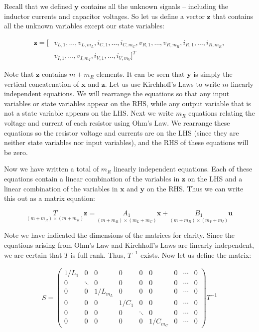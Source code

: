 \documentclass[14pt,a5paper,twoside]{book}
\begin{document}
Recall that we defined $\mathbf{y}$ contains all the unknown signals -- including the inductor currents and capacitor voltages. So let us define a vector $\mathbf{z}$ that contains all the unknown variables except our state variables:

\begin{align*}
\mathbf{z} = [&v_{L,1}, \ldots ,v_{L,m_L}, i_{C,1}, \ldots ,i_{C,m_C}, v_{R,1}, \ldots ,v_{R,m_R}, i_{R,1}, \ldots ,i_{R,m_R}, \\
			&v_{I,1}, \ldots, v_{I,m_I}, i_{V,1}, \ldots, i_{V,m_V}]^T
\end{align*}

Note that $\mathbf{z}$ contains $m+m_R$ elements. It can be seen that $\mathbf{y}$ is simply the vertical concatenation of $\mathbf{x}$ and $\mathbf{z}$. Let us use Kirchhoff's Laws to write $m$ linearly independent equations. We will rearrange the equations so that any input variables or state variables appear on the RHS, while any output variable that is not a state variable appears on the LHS. Next we write $m_R$ equations relating the voltage and current of each resistor using Ohm's Law. We rearrange these equations so the resistor voltage and currents are on the LHS (since they are neither state variables nor input variables), and the RHS of these equations will be zero.

Now we have written a total of $m_R$ linearly independent equations. Each of these equations contain a linear combination of the variables in $\mathbf{z}$ on the LHS and a linear combination of the variables in $\mathbf{x}$ and $\mathbf{y}$ on the RHS. Thus we can write this out as a matrix equation:

$$
\underset{(m+m_R)\times(m+m_R)}{T} \mathbf{z} = \underset{(m+m_R)\times(m_L+m_C)}{A_1} \mathbf{x} + \underset{(m+m_R)\times(m_V+m_I)}{B_1} \mathbf{u}
$$

Note we have indicated the dimensions of the matrices for clarity. Since the equations arising from Ohm's Law and Kirchhoff's Laws are linearly independent, we are certain that $T$ is full rank. Thus, $T^{-1}$ exists. Now let us define the matrix:

\begin{align*}
S = \begin{pmatrix}
1/L_1 	&0	&	0	&		0	&	0	&	0	&	0	&	\cdots	&	0 \\
	0	&\ddots	&	0	&	0	&	0	&	0	&	0	&	\cdots	&	0 \\
	0	&0	&1/L_{m_L}	&	0	&	0	&	0	&	0	&	\cdots	&	0 \\
	0	&0	&0		&	1/C_1	&	0	&	0	&	0	&	\cdots	&	0 \\
	0	&0	&0		&	0 		&\ddots	&	0	&	0	&	\cdots	&	0 \\
	0	&0	&0		&	0 		& 0	&	1/C_{m_C}&	0	&	\cdots	&	0
	\end{pmatrix} T^{-1}
\end{align*}
\end{document}
